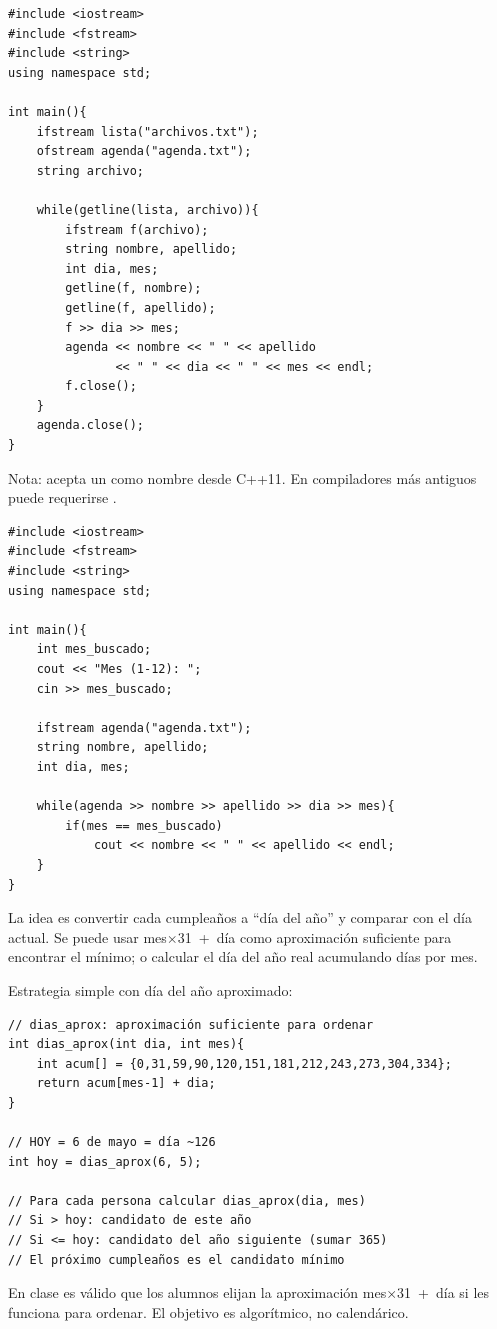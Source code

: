 \documentclass[12pt, oneside]{article}
\begin{document}
\begin{notaprofesor}
\begin{verbatim}
#include <iostream>
#include <fstream>
#include <string>
using namespace std;

int main(){
    ifstream lista("archivos.txt");
    ofstream agenda("agenda.txt");
    string archivo;

    while(getline(lista, archivo)){
        ifstream f(archivo);
        string nombre, apellido;
        int dia, mes;
        getline(f, nombre);
        getline(f, apellido);
        f >> dia >> mes;
        agenda << nombre << " " << apellido
               << " " << dia << " " << mes << endl;
        f.close();
    }
    agenda.close();
}
\end{verbatim}
  Nota:  acepta un  como nombre
  desde C++11.  En compiladores más antiguos puede requerirse
  .
\end{notaprofesor}

\begin{notaprofesor}
\begin{verbatim}
#include <iostream>
#include <fstream>
#include <string>
using namespace std;

int main(){
    int mes_buscado;
    cout << "Mes (1-12): ";
    cin >> mes_buscado;

    ifstream agenda("agenda.txt");
    string nombre, apellido;
    int dia, mes;

    while(agenda >> nombre >> apellido >> dia >> mes){
        if(mes == mes_buscado)
            cout << nombre << " " << apellido << endl;
    }
}
\end{verbatim}
\end{notaprofesor}

\begin{notaprofesor}
  La idea es convertir cada cumpleaños a ``día del año'' y comparar con
  el día actual.  Se puede usar mes$\times$31~+~día como aproximación
  suficiente para encontrar el mínimo; o calcular el día del año real
  acumulando días por mes.

  Estrategia simple con día del año aproximado:
\begin{verbatim}
// dias_aprox: aproximación suficiente para ordenar
int dias_aprox(int dia, int mes){
    int acum[] = {0,31,59,90,120,151,181,212,243,273,304,334};
    return acum[mes-1] + dia;
}

// HOY = 6 de mayo = día ~126
int hoy = dias_aprox(6, 5);

// Para cada persona calcular dias_aprox(dia, mes)
// Si > hoy: candidato de este año
// Si <= hoy: candidato del año siguiente (sumar 365)
// El próximo cumpleaños es el candidato mínimo
\end{verbatim}
  En clase es válido que los alumnos elijan la aproximación mes$\times$31~+~día
  si les funciona para ordenar.  El objetivo es algorítmico, no calendárico.
\end{notaprofesor}
\end{document}

